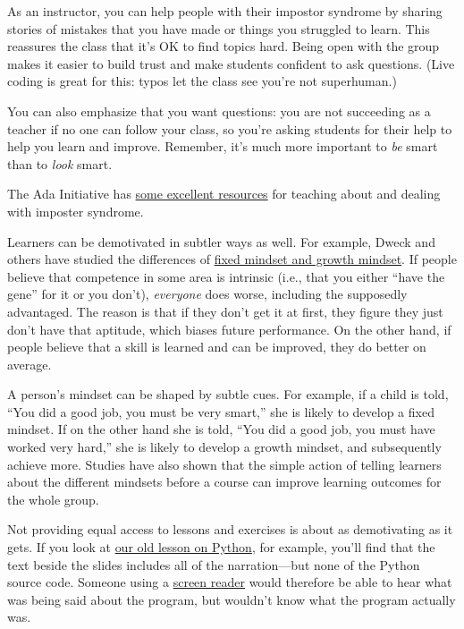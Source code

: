 As an instructor, you can help people with their impostor syndrome by
sharing stories of mistakes that you have made or things you struggled
to learn. This reassures the class that it's OK to find topics hard.
Being open with the group makes it easier to build trust and make
students confident to ask questions. (Live coding is great for this:
typos let the class see you're not superhuman.)

You can also emphasize that you want questions: you are not succeeding
as a teacher if no one can follow your class, so you're asking students
for their help to help you learn and improve. Remember, it's much more
important to \emph{be} smart than to \emph{look} smart.

The Ada Initiative has
\href{http://adainitiative.org/continue-our-work/impostor-syndrome-training/}{some
excellent resources} for teaching about and dealing with imposter
syndrome.


Learners can be demotivated in subtler ways as well. For example, Dweck
and others have studied the differences of
\href{https://en.wikipedia.org/wiki/Mindset\#Fixed\_mindset\_and\_growth\_mindset}{fixed
mindset and growth mindset}. If people believe that competence in some
area is intrinsic (i.e., that you either ``have the gene'' for it or you
don't), \emph{everyone} does worse, including the supposedly advantaged.
The reason is that if they don't get it at first, they figure they just
don't have that aptitude, which biases future performance. On the other
hand, if people believe that a skill is learned and can be improved,
they do better on average.

A person's mindset can be shaped by subtle cues. For example, if a child
is told, ``You did a good job, you must be very smart,'' she is likely
to develop a fixed mindset. If on the other hand she is told, ``You did
a good job, you must have worked very hard,'' she is likely to develop a
growth mindset, and subsequently achieve more. Studies have also shown
that the simple action of telling learners about the different mindsets
before a course can improve learning outcomes for the whole group.


Not providing equal access to lessons and exercises is about as
demotivating as it gets. If you look at
\href{http://swcarpentry.github.io/v4/python/flow.html}{our old lesson
on Python}, for example, you'll find that the text beside the slides
includes all of the narration---but none of the Python source code.
Someone using a
\href{https://en.wikipedia.org/wiki/Screen\_reader}{screen reader} would
therefore be able to hear what was being said about the program, but
wouldn't know what the program actually was.

